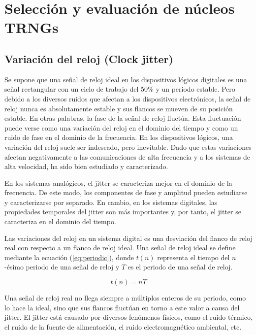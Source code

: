 \chapter{Selección y evaluación de núcleos TRNGs}		
	
	\section{Variación del reloj (Clock jitter)}
	
	Se supone que una señal de reloj ideal en los dispositivos lógicos digitales es una señal rectangular con un ciclo de trabajo del 50\% y un periodo estable. Pero debido a los diversos ruidos que afectan a los dispositivos electrónicos, la señal de reloj nunca es absolutamente estable y sus flancos se mueven de su posición estable. En otras palabras, la fase de la señal de reloj fluctúa. Esta fluctuación puede verse como una variación del reloj en el dominio del tiempo y como un ruido de fase en el dominio de la frecuencia. En los dispositivos lógicos, una variación del reloj suele ser indeseado, pero inevitable. Dado que estas variaciones afectan negativamente a las comunicaciones de alta frecuencia y a los sistemas de alta velocidad, ha sido bien estudiado y caracterizado.
	
	En los sistemas analógicos, el jitter se caracteriza mejor en el dominio de la frecuencia. De este modo, los componentes de fase y amplitud pueden estudiarse y caracterizarse por separado. En cambio, en los sistemas digitales, las propiedades temporales del jitter son más importantes y, por tanto, el jitter se caracteriza en el dominio del tiempo.
	
	Las variaciones del reloj en un sistema digital es una desviación del flanco de reloj real con respecto a un flanco de reloj ideal. Una señal de reloj ideal se define mediante la ecuación (\ref{eq:periodic}), donde $t(n)$ representa el tiempo del $n$-ésimo periodo de una señal de reloj y $T$ es el periodo de una señal de reloj.
	
	\begin{equation}
		t(n) =  n T
	\label{eq:periodic}
	\end{equation}
	
	Una señal de reloj real no llega siempre a múltiplos enteros de su periodo, como lo hace la ideal, sino que sus flancos fluctúan en torno a este valor a causa del jitter. El jitter está causado por diversos fenómenos físicos, como el ruido térmico, el ruido de la fuente de alimentación, el ruido electromagnético ambiental, etc.	
	
